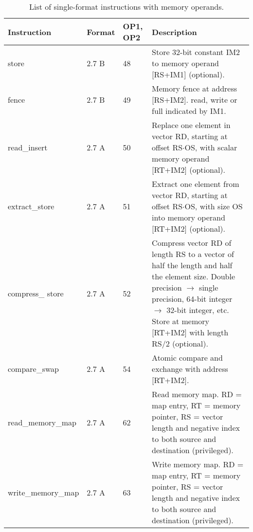 \documentclass[forwardcom.tex]{subfiles}
\begin{document}
\begin{longtable} {|p{20mm}|p{10mm}|p{8mm}|p{75mm}|}
\caption{List of single-format instructions with memory operands.} 
\label{table:ListOfSingleFormatInstructionsMemory} \\
\endfirsthead
\endhead
\hline
\bfseries Instruction & \bfseries Format &\bfseries OP1, OP2 & \bfseries Description \\
\hline
store         & 2.7 B & 48 & Store 32-bit constant IM2 to memory operand [RS+IM1] (optional). \\

fence         & 2.7 B & 49 & Memory fence at address [RS+IM2]. read, write or full indicated by IM1.\\

read\_insert  & 2.7 A & 50 & Replace one element in vector RD, starting at offset 
RS$\cdot$OS, with scalar memory operand [RT+IM2] (optional).  \\

extract\_store& 2.7 A & 51 & Extract one element from vector RD, starting at offset RS$\cdot$OS, with size OS into memory operand [RT+IM2] (optional). \\

compress\_ store& 2.7 A & 52 & Compress vector RD of length RS to a vector of half the length and half the element size. Double precision $\rightarrow$ single precision, 64-bit integer $\rightarrow$ 32-bit integer, etc. Store at memory [RT+IM2] with length RS/2 (optional).\\

compare\_swap     & 2.7 A & 54 & Atomic compare and exchange with address [RT+IM2].\\

read\_memory\_\newline map  & 2.7 A & 62 & Read memory map. RD = map entry, RT = memory pointer, RS = vector length and negative index to both source and destination (privileged). \\
write\_memory\_\newline map & 2.7 A & 63 & Write memory map. RD = map entry, RT = memory pointer, RS = vector length and negative index to both source and destination (privileged). \\

\hline
\end{longtable}
\end{document}
